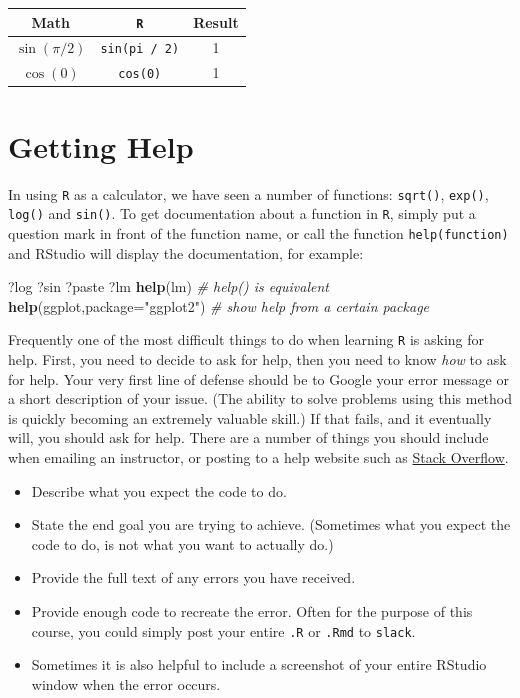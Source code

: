 \documentclass[]{book}
\newenvironment{Shaded}{\begin{snugshade}}{\end{snugshade}}
\newcommand{\KeywordTok}[1]{\textcolor[rgb]{0.13,0.29,0.53}{\textbf{#1}}}
\newcommand{\DataTypeTok}[1]{\textcolor[rgb]{0.13,0.29,0.53}{#1}}
\newcommand{\StringTok}[1]{\textcolor[rgb]{0.31,0.60,0.02}{#1}}
\newcommand{\CommentTok}[1]{\textcolor[rgb]{0.56,0.35,0.01}{\textit{#1}}}
\newcommand{\NormalTok}[1]{#1}
\providecommand{\tightlist}{%
  \setlength{\itemsep}{0pt}\setlength{\parskip}{0pt}}
\theoremstyle{definition}
\theoremstyle{definition}
\theoremstyle{definition}
\theoremstyle{remark}
\begin{document}
\begin{longtable}[]{@{}ccc@{}}
\toprule
Math & \texttt{R} & Result\tabularnewline
\midrule
\endhead
\(\sin(\pi / 2)\) & \texttt{sin(pi\ /\ 2)} & 1\tabularnewline
\(\cos(0)\) & \texttt{cos(0)} & 1\tabularnewline
\bottomrule
\end{longtable}

\section{Getting Help}\label{getting-help}

In using \texttt{R} as a calculator, we have seen a number of functions:
\texttt{sqrt()}, \texttt{exp()}, \texttt{log()} and \texttt{sin()}. To
get documentation about a function in \texttt{R}, simply put a question
mark in front of the function name, or call the function
\texttt{help(function)} and RStudio will display the documentation, for
example:

\begin{Shaded}
\begin{Highlighting}[]
\NormalTok{?log}
\NormalTok{?sin}
\NormalTok{?paste}
\NormalTok{?lm}
\KeywordTok{help}\NormalTok{(lm)   }\CommentTok{# help() is equivalent}
\KeywordTok{help}\NormalTok{(ggplot,}\DataTypeTok{package=}\StringTok{"ggplot2"}\NormalTok{)  }\CommentTok{# show help from a certain package}
\end{Highlighting}
\end{Shaded}

Frequently one of the most difficult things to do when learning
\texttt{R} is asking for help. First, you need to decide to ask for
help, then you need to know \emph{how} to ask for help. Your very first
line of defense should be to Google your error message or a short
description of your issue. (The ability to solve problems using this
method is quickly becoming an extremely valuable skill.) If that fails,
and it eventually will, you should ask for help. There are a number of
things you should include when emailing an instructor, or posting to a
help website such as \href{https://stackoverflow.com}{Stack Overflow}.

\begin{itemize}
\tightlist
\item
  Describe what you expect the code to do.
\item
  State the end goal you are trying to achieve. (Sometimes what you
  expect the code to do, is not what you want to actually do.)
\item
  Provide the full text of any errors you have received.
\item
  Provide enough code to recreate the error. Often for the purpose of
  this course, you could simply post your entire \texttt{.R} or
  \texttt{.Rmd} to \texttt{slack}.
\item
  Sometimes it is also helpful to include a screenshot of your entire
  RStudio window when the error occurs.
\end{itemize}
\end{document}
